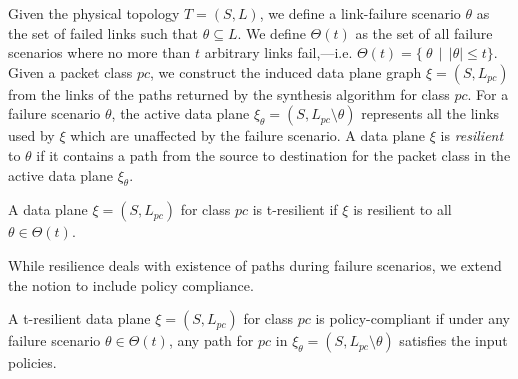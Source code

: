 Given the physical topology $T=(S,L)$, we define a link-failure
scenario $\theta$ as the set of failed links such that $\theta \subseteq L$.
	We define $\Theta(t)$ as the set of all failure scenarios where no more than $t$
	arbitrary links fail,---i.e. $\Theta(t) = \{ \ \theta \ \ | \ \ |\theta| \leq t\}$.
Given a packet class $pc$,
we construct the induced data plane graph $\xi = (S, L_{pc})$ from the links
of the paths returned by the synthesis algorithm for class $pc$.
 For a failure scenario
$\theta$, the active data plane $\xi_\theta = (S, L_{pc} \setminus \theta)$ represents
all the links used by $\xi$ which are unaffected by the failure scenario. A data
plane $\xi$ is {\em resilient} to $\theta$ if it contains a path from the source to 
destination for the packet class in the active data plane $\xi_\theta$.
\begin{mydef}[Resilience]
	A data plane $\xi = (S, L_{pc})$ for class $pc$ is t-resilient if $\xi$ is 
	resilient to all $\theta \in \Theta(t)$.
\end{mydef}
While resilience deals with 
existence of paths during failure scenarios,
we extend the notion to include policy compliance.
\begin{mydef}
	A t-resilient data plane $\xi = (S, L_{pc})$ for class $pc$ is policy-compliant if under
	any failure scenario $\theta \in \Theta(t)$, any path for $pc$ in 
	$\xi_\theta=(S, L_{pc} \setminus \theta)$ satisfies the input policies. 
\end{mydef}
